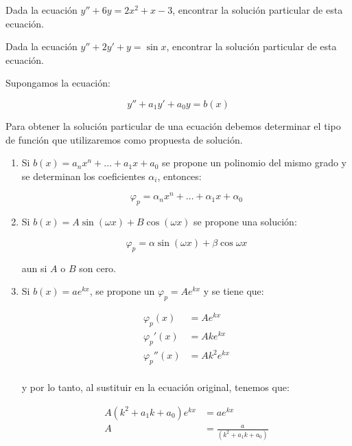 		\begin{ejercicio}
			Dada la ecuación $y'' + 6 y = 2 x^2 + x - 3$, encontrar la solución particular de esta ecuación.
		\end{ejercicio}

		\begin{ejercicio}
			Dada la ecuación $y'' + 2 y' + y = \sin{x}$, encontrar la solución particular de esta ecuación.
		\end{ejercicio}

		\begin{observacion}
			Supongamos la ecuación:

			\begin{equation}
				y'' + a_1 y' + a_0 y = b(x)
			\end{equation}

			Para obtener la solución particular de una ecuación debemos determinar el tipo de función que utilizaremos como propuesta de solución.

			\begin{enumerate}
				\item Si $b(x) = a_n x^n + \dots + a_1 x + a_0$ se propone un polinomio del mismo grado y se determinan los coeficientes $\alpha_i$, entonces:

				\begin{equation*}
					\varphi_p = \alpha_n x^n + \dots + \alpha_1 x + \alpha_0
				\end{equation*}

				\item Si $b(x) = A \sin{(\omega x)} + B \cos{(\omega x)}$ se propone una solución:

				\begin{equation*}
					\varphi_p = \alpha \sin{(\omega x)} + \beta \cos{\omega x}
				\end{equation*}

				aun si $A$ o $B$ son cero.

				\item Si $b(x) = a e^{kx}$, se propone un $\varphi_p = A e^{kx}$ y se tiene que:
				
				\begin{align*}
					\varphi_p(x) &= A e^{kx} \\
					\varphi_p'(x) &= Ak e^{kx} \\
					\varphi_p''(x) &= Ak^2 e^{kx} \\
				\end{align*}

				y por lo tanto, al sustituir en la ecuación original, tenemos que:

				\begin{align*}
					A (k^2 + a_1 k + a_0) e^{kx} &= a e^{kx} \\
					A &= \frac{a}{(k^2 + a_1 k + a_0)}
				\end{align*}
			\end{enumerate}
		\end{observacion}

